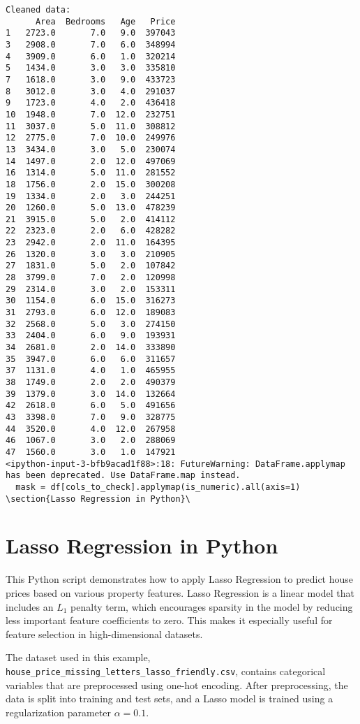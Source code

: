 \documentclass[12pt, a4paper]{report}
\begin{document}
\begin{lstlisting}[style=pythonstyle]
Cleaned data:
      Area  Bedrooms   Age   Price
1   2723.0       7.0   9.0  397043
3   2908.0       7.0   6.0  348994
4   3909.0       6.0   1.0  320214
5   1434.0       3.0   3.0  335810
7   1618.0       3.0   9.0  433723
8   3012.0       3.0   4.0  291037
9   1723.0       4.0   2.0  436418
10  1948.0       7.0  12.0  232751
11  3037.0       5.0  11.0  308812
12  2775.0       7.0  10.0  249976
13  3434.0       3.0   5.0  230074
14  1497.0       2.0  12.0  497069
16  1314.0       5.0  11.0  281552
18  1756.0       2.0  15.0  300208
19  1334.0       2.0   3.0  244251
20  1260.0       5.0  13.0  478239
21  3915.0       5.0   2.0  414112
22  2323.0       2.0   6.0  428282
23  2942.0       2.0  11.0  164395
26  1320.0       3.0   3.0  210905
27  1831.0       5.0   2.0  107842
28  3799.0       7.0   2.0  120998
29  2314.0       3.0   2.0  153311
30  1154.0       6.0  15.0  316273
31  2793.0       6.0  12.0  189083
32  2568.0       5.0   3.0  274150
33  2404.0       6.0   9.0  193931
34  2681.0       2.0  14.0  333890
35  3947.0       6.0   6.0  311657
37  1131.0       4.0   1.0  465955
38  1749.0       2.0   2.0  490379
39  1379.0       3.0  14.0  132664
42  2618.0       6.0   5.0  491656
43  3398.0       7.0   9.0  328775
44  3520.0       4.0  12.0  267958
46  1067.0       3.0   2.0  288069
47  1560.0       3.0   1.0  147921
<ipython-input-3-bfb9acad1f88>:18: FutureWarning: DataFrame.applymap has been deprecated. Use DataFrame.map instead.
  mask = df[cols_to_check].applymap(is_numeric).all(axis=1)
\section{Lasso Regression in Python}\
\end{lstlisting}
\newpage
\section{Lasso Regression in Python}
This Python script demonstrates how to apply Lasso Regression to predict house prices based on various property features. Lasso Regression is a linear model that includes an $L_1$ penalty term, which encourages sparsity in the model by reducing less important feature coefficients to zero. This makes it especially useful for feature selection in high-dimensional datasets.

The dataset used in this example, \texttt{house\_price\_missing\_letters\_lasso\_friendly.csv}, contains categorical variables that are preprocessed using one-hot encoding. After preprocessing, the data is split into training and test sets, and a Lasso model is trained using a regularization parameter $\alpha = 0.1$.
\end{document}
